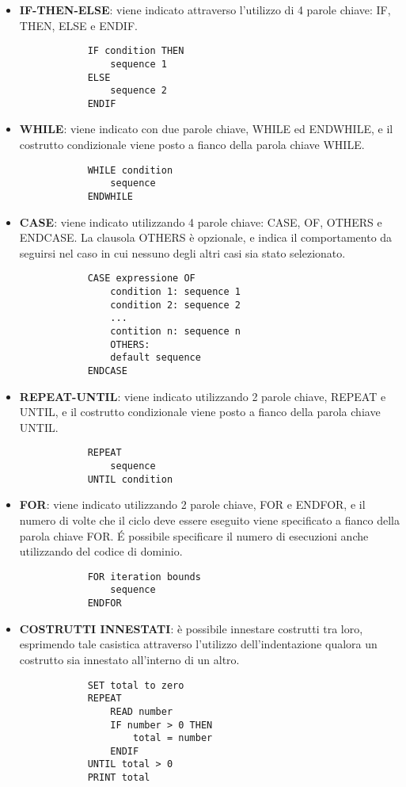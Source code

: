 \begin{itemize}
	\item \textbf{IF-THEN-ELSE}: viene indicato attraverso l'utilizzo di 4 parole chiave: IF, THEN, ELSE e ENDIF.
		\begin{Verbatim}
			IF condition THEN
				sequence 1
			ELSE
				sequence 2
			ENDIF
		\end{Verbatim}
	\item \textbf{WHILE}: viene indicato con due parole chiave, WHILE ed ENDWHILE, e il costrutto condizionale viene posto a fianco della parola chiave WHILE.
		\begin{Verbatim}
			WHILE condition
				sequence
			ENDWHILE			
		\end{Verbatim}
	\item \textbf{CASE}: viene indicato utilizzando 4 parole chiave: CASE, OF, OTHERS e ENDCASE. La clausola OTHERS è opzionale, e indica il comportamento da seguirsi nel caso in cui nessuno degli altri casi sia stato selezionato.
		\begin{Verbatim}
			CASE expressione OF
				condition 1: sequence 1
				condition 2: sequence 2
				...
				contition n: sequence n
				OTHERS:
				default sequence
			ENDCASE
		\end{Verbatim}		 	
	\item \textbf{REPEAT-UNTIL}: viene indicato utilizzando 2 parole chiave, REPEAT e UNTIL, e il costrutto condizionale viene posto a fianco della parola chiave UNTIL.
		\begin{Verbatim}
			REPEAT
				sequence
			UNTIL condition
		\end{Verbatim}
	\item \textbf{FOR}: viene indicato utilizzando 2 parole chiave, FOR e ENDFOR, e il numero di volte che il ciclo deve essere eseguito viene specificato a fianco della parola chiave FOR. É possibile specificare il numero di esecuzioni anche utilizzando del codice di dominio.
		\begin{Verbatim}
			FOR iteration bounds
				sequence
			ENDFOR
		\end{Verbatim}
		
	\item \textbf{COSTRUTTI INNESTATI}: è possibile innestare costrutti tra loro, esprimendo tale casistica attraverso l'utilizzo dell'indentazione qualora un costrutto sia innestato all'interno di un altro.
		\begin{Verbatim}
			SET total to zero
			REPEAT
				READ number
				IF number > 0 THEN
					total = number
				ENDIF
			UNTIL total > 0
			PRINT total					
		\end{Verbatim}
		

\end{itemize}
